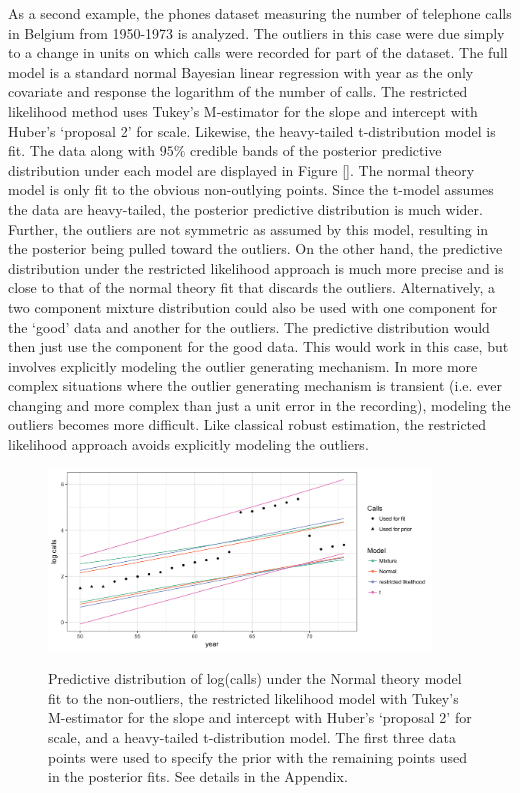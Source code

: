 \documentclass[11pt]{article}
\begin{document}
As a second example, the phones dataset measuring the number of telephone calls in Belgium from 1950-1973 is analyzed. The outliers in this case were due simply to a change in units on which calls were recorded for part of the dataset. The full model is a standard normal Bayesian linear regression with year as the only covariate and response the logarithm of the number of calls. The restricted likelihood method uses Tukey's M-estimator for the slope and intercept with Huber's `proposal 2'  for scale. Likewise, the heavy-tailed t-distribution model is fit. The data along with  $95\%$ credible bands of the posterior predictive distribution under each model are displayed in Figure \ref{}. The normal theory model is only fit to the obvious non-outlying points. Since the t-model assumes the data are heavy-tailed, the posterior predictive distribution is much wider. Further, the outliers are not symmetric as assumed by this model, resulting in the posterior being pulled toward the outliers. On the other hand, the predictive distribution under the restricted likelihood approach is much more precise and is close to that of the normal theory fit that discards the outliers. Alternatively, a two component mixture distribution could also be used with one component for the `good' data and another for the outliers. The predictive distribution would then just use the component for the good data. This would work in this case, but involves explicitly modeling the outlier generating mechanism. In more more complex situations where the outlier generating mechanism is transient (i.e. ever changing and more complex than just a unit error in the recording), modeling the outliers becomes more difficult. Like classical robust estimation, the restricted likelihood approach avoids explicitly modeling the outliers. 

\begin{figure}
\centering
{\includegraphics[width = 4in]{figs/calls_predictive.png}}
\label{fig:calls_predictive}
\caption{Predictive distribution of log(calls) under the Normal theory model fit to the non-outliers, the restricted likelihood model with  Tukey's M-estimator for the slope and intercept with Huber's `proposal 2'  for scale, and a heavy-tailed t-distribution model. The first three data points were used to specify the prior with the remaining points used in the posterior fits. See details in the Appendix. }
\end{figure}
\end{document}
